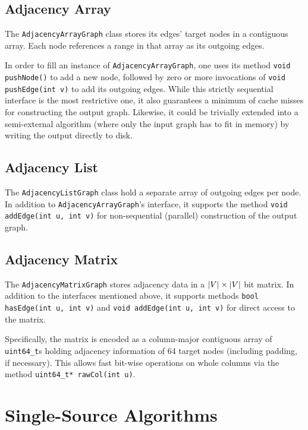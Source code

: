 \documentclass[12pt,a4paper,twoside]{article}
\begin{document}
\subsection{Adjacency Array}

The \verb|AdjacencyArrayGraph| class stores its edges' target nodes in a contiguous array. Each node references a range in that array as its outgoing edges.

In order to fill an instance of \verb|AdjacencyArrayGraph|, one uses its method \verb|void pushNode()| to add a new node, followed by zero or more invocations of \verb|void pushEdge(int v)| to add its outgoing edges. While this strictly sequential interface is the most restrictive one, it also guarantees a minimum of cache misses for constructing the output graph. Likewise, it could be trivially extended into a semi-external algorithm (where only the input graph has to fit in memory) by writing the output directly to disk.

\subsection{Adjacency List}

The \verb|AdjacencyListGraph| class hold a separate array of outgoing edges per node. In addition to \verb|AdjacencyArrayGraph|'s interface, it supports the method \verb|void addEdge(int u, int v)| for non-sequential (\eg parallel) construction of the output graph.

\subsection{Adjacency Matrix}

The \verb|AdjacencyMatrixGraph| stores adjacency data in a $\left|V\right| \times \left|V\right|$ bit matrix. In addition to the interfaces mentioned above, it supports methods \verb|bool hasEdge(int u, int v)| and \verb|void addEdge(int u, int v)| for direct access to the matrix.

Specifically, the matrix is encoded as a column-major contiguous array of \verb|uint64_t|s holding adjacency information of 64 target nodes (including padding, if necessary). This allows fast bit-wise operations on whole columns via the method \verb|uint64_t* rawCol(int u)|.

\section{Single-Source Algorithms}
\end{document}
